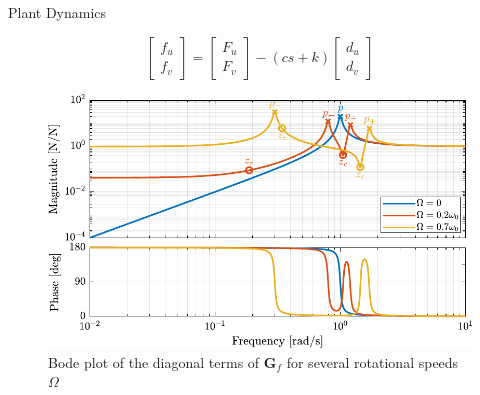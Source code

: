 \documentclass[t, minted]{clean-beamer}
\begin{document}
\begin{frame}[label={sec:org387ca99}]{Plant Dynamics}
\vspace{-1em}

\begin{equation*}
  \begin{bmatrix} f_{u} \\ f_{v} \end{bmatrix} =
  \begin{bmatrix} F_u \\ F_v \end{bmatrix} - (c s + k)
  \begin{bmatrix} d_u \\ d_v \end{bmatrix}
\end{equation*}

\begin{figure}[htbp]
\centering
\includegraphics[width=0.9\linewidth]{figs/plant_iff_compare_rotating_speed.pdf}
\caption{Bode plot of the diagonal terms of \(\bm{G}_f\) for several rotational speeds \(\Omega\)}
\end{figure}
\end{frame}
\end{document}
